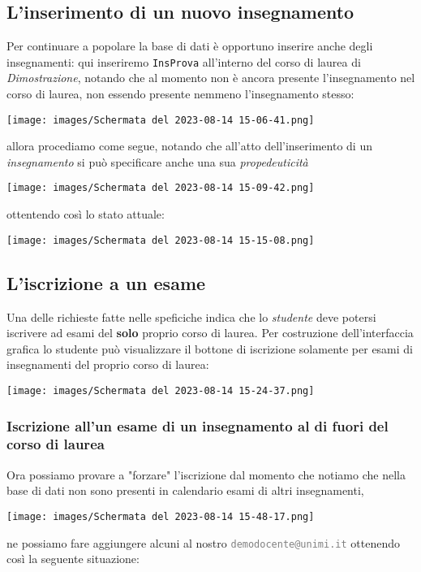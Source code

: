 \documentclass{article}
\newcommand{\attr}[1]{\texttt{\textcolor{gray}{#1}}}
\newcommand{\und}[0]{\textunderscore}
\begin{document}
\subsection{L'inserimento di un nuovo insegnamento}
Per continuare a popolare la base di dati è opportuno inserire anche degli insegnamenti: qui inseriremo \texttt{InsProva} all'interno del corso di laurea di \textit{Dimostrazione}, notando che al momento non è ancora presente l'insegnamento nel corso di laurea, non essendo presente nemmeno l'insegnamento stesso:

\texttt{[image: images/Schermata del 2023-08-14 15-06-41.png]}

allora procediamo come segue, notando che all'atto dell'inserimento di un \textit{insegnamento} si può specificare anche una sua \textit{propedeuticità}

\texttt{[image: images/Schermata del 2023-08-14 15-09-42.png]}

ottentendo così lo stato attuale:

\texttt{[image: images/Schermata del 2023-08-14 15-15-08.png]}

\subsection{L'iscrizione a un esame}
Una delle richieste fatte nelle speficiche indica che lo \textit{studente} deve potersi iscrivere ad esami del \textbf{solo} proprio corso di laurea. Per costruzione dell'interfaccia grafica lo studente può visualizzare il bottone di iscrizione solamente per esami di insegnamenti del proprio corso di laurea:

\texttt{[image: images/Schermata del 2023-08-14 15-24-37.png]}

\subsubsection{Iscrizione all'un esame di un insegnamento al di fuori del corso di laurea}

Ora possiamo provare a "forzare" l'iscrizione dal momento che notiamo che nella base di dati non sono presenti in calendario esami di altri insegnamenti,

\texttt{[image: images/Schermata del 2023-08-14 15-48-17.png]}

ne possiamo fare aggiungere alcuni al nostro \attr{demo\und docente@unimi.it} ottenendo così la seguente situazione:
\end{document}
